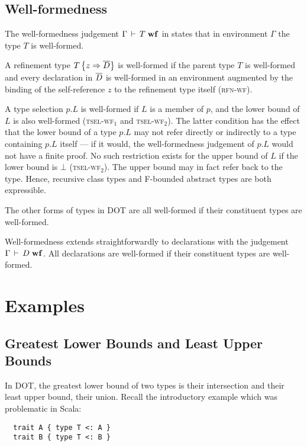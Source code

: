 \documentclass[9pt]{sigplanconf}
\begin{document}
\subsection{Well-formedness}

The well-formedness judgement $\Gamma \,\vdash\, T \;\mbox{\textbf{wf}}$ in 
states that in environment $\Gamma$ the type $T$ is
well-formed.

A refinement type $T \left\{z \Rightarrow \overline{D} \right\}$ is
well-formed if the parent type $T$ is well-formed and every
declaration in $\overline{D}$ is well-formed in an environment augmented by
the binding of the self-reference $z$ to the refinement type itself
(\textsc{rfn-wf}).

A type selection $p.L$ is well-formed if $L$ is a member of $p$, and
the lower bound of $L$ is also well-formed (\textsc{tsel-wf$_1$} and
\textsc{tsel-wf$_2$}). The latter condition has the effect that the
lower bound of a type $p.L$ may not refer directly or indirectly to a
type containing $p.L$ itself --- if it would, the well-formedness
judgement of $p.L$ would not have a finite proof. No such restriction
exists for the upper bound of $L$ if the lower bound is $\bot$
(\textsc{tsel-wf$_2$}). The upper bound may in fact refer back to the
type. Hence, recursive class types and F-bounded abstract types are
both expressible.

The other forms of types in DOT are all well-formed if their
constituent types are well-formed.

Well-formedness extends straightforwardly to declarations with the
judgement $\Gamma \,\vdash\, D \;\mbox{\textbf{wf}}$. All declarations are well-formed if
their constituent types are well-formed.

\section{Examples}\label{dot-examples}

\subsection{Greatest Lower Bounds and Least Upper Bounds}

In DOT, the greatest lower bound of two types is their intersection and their least upper bound,
their union. Recall the introductory example which was problematic in
Scala:
\begin{lstlisting}
  trait A { type T <: A }
  trait B { type T <: B }
\end{lstlisting}
\end{document}
